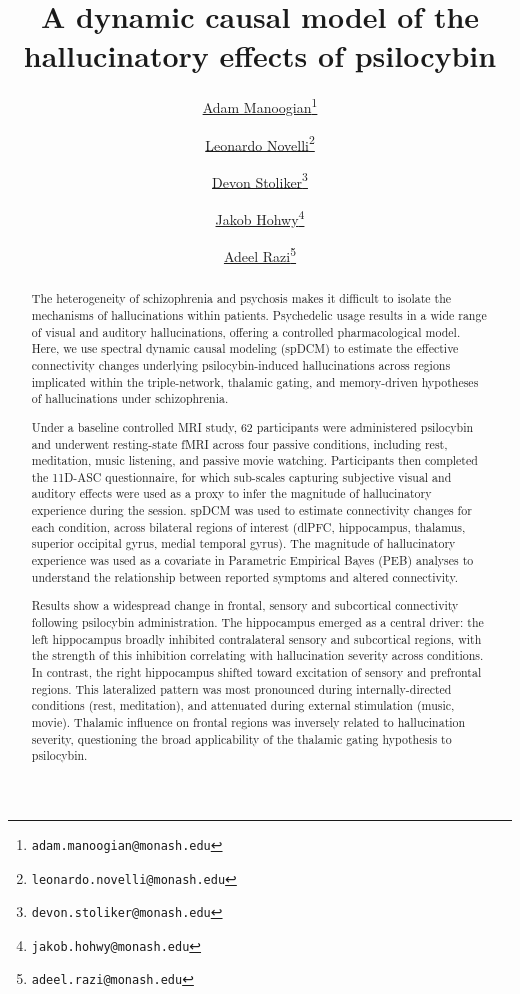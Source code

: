 \documentclass{article}
\title{A dynamic causal model of the hallucinatory effects of psilocybin}
\author[1,2,3]{%
	\href{https://orcid.org/0009-0002-8002-3191}{\usebox{\orcid}\hspace{1mm}Adam Manoogian\thanks{\texttt{adam.manoogian@monash.edu}}}%
}
\author[2]{%
	\href{https://orcid.org/0000-0002-6081-3367}{\usebox{\orcid}\hspace{1mm}Leonardo Novelli\thanks{\texttt{leonardo.novelli@monash.edu}}}%
}
\author[2]{%
	\href{https://orcid.org/0000-0000-0000}{\usebox{\orcid}\hspace{1mm}Devon Stoliker\thanks{\texttt{devon.stoliker@monash.edu}}}%
}
\author[1]{%
	\href{https://orcid.org/0000-0003-3906-3060}{\usebox{\orcid}\hspace{1mm}Jakob  Hohwy\thanks{\texttt{jakob.hohwy@monash.edu}}}%
}
\author[2,3]{%
	\href{https://orcid.org/0000-0002-0779-9439}{\usebox{\orcid}\hspace{1mm}Adeel  Razi\thanks{\texttt{adeel.razi@monash.edu}}}%
}
\affil[1]{Monash Centre for Consciousness and Contemplative Studies, Monash University, Melbourne, Australia}
\affil[2]{Monash Biomedical Imaging, Monash University, Clayton, VIC, Australia}
\affil[3]{Turner Institute for Brain and Mental Health, Monash University, Clayton, VIC, Australia}
\begin{document}
\maketitle

\begin{abstract}

The heterogeneity of schizophrenia and psychosis makes it difficult to isolate the mechanisms of hallucinations within patients. Psychedelic usage results in a wide range of visual and auditory hallucinations, offering a controlled pharmacological model. Here, we use spectral dynamic causal modeling (spDCM) to estimate the effective connectivity changes underlying psilocybin-induced hallucinations across regions implicated within the triple-network, thalamic gating, and memory-driven hypotheses of hallucinations under schizophrenia.

Under a baseline controlled MRI study, 62 participants were administered psilocybin and underwent resting-state fMRI across four passive conditions, including rest, meditation, music listening, and passive movie watching. Participants then completed the 11D-ASC questionnaire, for which sub-scales capturing subjective visual and auditory effects were used as a proxy to infer the magnitude of hallucinatory experience during the session. spDCM was used to estimate connectivity changes for each condition, across bilateral regions of interest (dlPFC, hippocampus, thalamus, superior occipital gyrus, medial temporal gyrus). The magnitude of hallucinatory experience was used as a covariate in Parametric Empirical Bayes (PEB) analyses to understand the relationship between reported symptoms and altered connectivity.

Results show a widespread change in frontal, sensory and subcortical connectivity following psilocybin administration. The hippocampus emerged as a central driver: the left hippocampus broadly inhibited contralateral sensory and subcortical regions, with the strength of this inhibition correlating with hallucination severity across conditions. In contrast, the right hippocampus shifted toward excitation of sensory and prefrontal regions. This lateralized pattern was most pronounced during internally-directed conditions (rest, meditation), and attenuated during external stimulation (music, movie). Thalamic influence on frontal regions was inversely related to hallucination severity, questioning the broad applicability of the thalamic gating hypothesis to psilocybin. 

\end{abstract}
\end{document}
